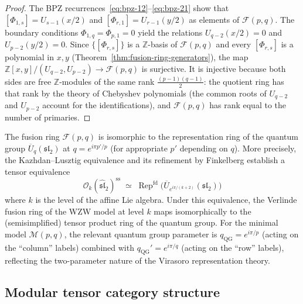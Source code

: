 \begin{proof}
The BPZ recurrences~\eqref{eq:bpz-12}--\eqref{eq:bpz-21} show that
$[\Phi_{1,s}] = U_{s-1}(x/2)$ and $[\Phi_{r,1}] = U_{r-1}(y/2)$ as elements
of $\mathcal{F}(p,q)$. The boundary conditions $\Phi_{1,q} = \Phi_{p,1} = 0$
yield the relations $U_{q-2}(x/2) = 0$ and $U_{p-2}(y/2) = 0$. Since
$\{[\Phi_{r,s}]\}$ is a $\mathbb{Z}$-basis of $\mathcal{F}(p,q)$ and every
$[\Phi_{r,s}]$ is a polynomial in $x, y$ (Theorem~\ref{thm:fusion-ring-generators}),
the map $\mathbb{Z}[x,y]/(U_{q-2}, U_{p-2}) \to \mathcal{F}(p,q)$ is surjective.
It is injective because both sides are free $\mathbb{Z}$-modules of the same
rank $\frac{(p-1)(q-1)}{2}$: the quotient ring has that rank by the theory of
Chebyshev polynomials (the common roots of $U_{q-2}$ and $U_{p-2}$ account
for the identifications), and $\mathcal{F}(p,q)$ has rank equal to the number
of primaries.
\end{proof}

\begin{proposition}\label{prop:fusion-quantum-group}
The fusion ring $\mathcal{F}(p,q)$ is isomorphic to the representation ring
of the quantum group $\overline{U}_q(\mathfrak{sl}_2)$ at $q = e^{i\pi p'/p}$
(for appropriate $p'$ depending on $q$). More precisely, the
Kazhdan--Lusztig equivalence \cite{KL93} and its refinement by
Finkelberg \cite{Finkelberg96} establish a tensor equivalence
\begin{equation}\label{eq:kl-fusion}
\mathcal{O}_k(\widehat{\mathfrak{sl}}_2)^{\mathrm{ss}}
\;\simeq\; \operatorname{Rep}^{\mathrm{fd}}\!\bigl(\overline{U}_{e^{i\pi/(k+2)}}(\mathfrak{sl}_2)\bigr)
\end{equation}
where $k$ is the level of the affine Lie algebra. Under this equivalence, the
Verlinde fusion ring of the WZW model at level $k$ maps isomorphically to the
(semisimplified) tensor product ring of the quantum group. For the minimal model
$\mathcal{M}(p,q)$, the relevant quantum group parameter is
$q_{\mathrm{QG}} = e^{i\pi/p}$ (acting on the ``column'' labels) combined with
$q_{\mathrm{QG}}' = e^{i\pi/q}$ (acting on the ``row'' labels), reflecting the
two-parameter nature of the Virasoro representation theory.
\end{proposition}

\subsection{Modular tensor category structure}
\label{subsec:mtc-structure}

